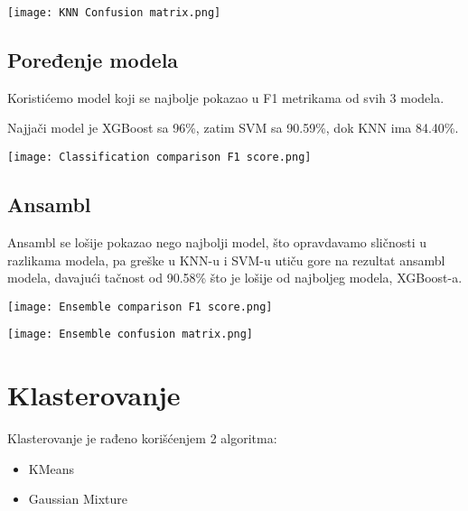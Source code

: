 \documentclass[a4paper]{article}
\begin{document}
        \begin{center}
            \label{im:KNN Confusion matrix}
            \texttt{[image: KNN Confusion matrix.png]}
        \end{center}
        
    \subsection{Poređenje modela}
        Koristićemo model koji se najbolje pokazao u F1 metrikama od svih 3 modela.

        \par Najjači model je XGBoost sa 96\%, zatim SVM sa 90.59\%, dok KNN ima 84.40\%.

        \begin{center}
            \label{im:Classification comparison F1 score}
            \texttt{[image: Classification comparison F1 score.png]}
        \end{center}

    \subsection{Ansambl}
        Ansambl se lošije pokazao nego najbolji model, što opravdavamo sličnosti u razlikama modela, pa greške u KNN-u i SVM-u utiču gore na rezultat ansambl modela, davajući tačnost od 90.58\% što je lošije od najboljeg modela, XGBoost-a.

        \begin{center}
            \label{im:Ensemble comparison F1 score}
            \texttt{[image: Ensemble comparison F1 score.png]}
        \end{center}

        \begin{center}
            \label{im:Ensemble confusion matrix}
            \texttt{[image: Ensemble confusion matrix.png]}
        \end{center}

\section{Klasterovanje}
    Klasterovanje je rađeno korišćenjem 2 algoritma: 
    \begin{itemize}
        \item KMeans
        \item Gaussian Mixture
    \end{itemize}
\end{document}
